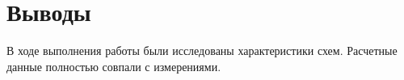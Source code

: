 \section{Выводы}
В ходе выполнения работы были исследованы характеристики схем. Расчетные данные полностью совпали с измерениями.
